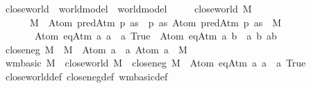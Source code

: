 \begin{isabellebody}
\ close{\isacharunderscore}{\kern0pt}world\ {\isacharcolon}{\kern0pt}{\isacharcolon}{\kern0pt}\ {\isachardoublequoteopen}world{\isacharunderscore}{\kern0pt}model\ {\isasymRightarrow}\ world{\isacharunderscore}{\kern0pt}model{\isachardoublequoteclose}\ \isanewline
\ \ \ \ {\isachardoublequoteopen}close{\isacharunderscore}{\kern0pt}world\ M\ {\isacharequal}{\kern0pt}\isanewline
\ \ \ \ \ \ M\ {\isasymunion}\ {\isacharbraceleft}{\kern0pt}\isactrlbold {\isasymnot}{\isacharparenleft}{\kern0pt}Atom\ {\isacharparenleft}{\kern0pt}predAtm\ p\ as{\isacharparenright}{\kern0pt}{\isacharparenright}{\kern0pt}\ {\isacharbar}{\kern0pt}\ p\ as{\isachardot}{\kern0pt}\ Atom\ {\isacharparenleft}{\kern0pt}predAtm\ p\ as{\isacharparenright}{\kern0pt}\ {\isasymnotin}\ M{\isacharbraceright}{\kern0pt}\isanewline
\ \ \ \ \ \ {\isasymunion}\ {\isacharbraceleft}{\kern0pt}Atom\ {\isacharparenleft}{\kern0pt}eqAtm\ a\ a{\isacharparenright}{\kern0pt}\ {\isacharbar}{\kern0pt}\ a{\isachardot}{\kern0pt}\ True{\isacharbraceright}{\kern0pt}\ {\isasymunion}\ {\isacharbraceleft}{\kern0pt}\isactrlbold {\isasymnot}{\isacharparenleft}{\kern0pt}Atom\ {\isacharparenleft}{\kern0pt}eqAtm\ a\ b{\isacharparenright}{\kern0pt}{\isacharparenright}{\kern0pt}\ {\isacharbar}{\kern0pt}\ a\ b{\isachardot}{\kern0pt}\ a{\isasymnoteq}b{\isacharbraceright}{\kern0pt}{\isachardoublequoteclose}\isanewline
\isanewline
\ \ \isamarkupfalse%
\ {\isachardoublequoteopen}close{\isacharunderscore}{\kern0pt}neg\ M\ {\isasymequiv}\ M\ {\isasymunion}\ {\isacharbraceleft}{\kern0pt}\isactrlbold {\isasymnot}{\isacharparenleft}{\kern0pt}Atom\ a{\isacharparenright}{\kern0pt}\ {\isacharbar}{\kern0pt}\ a{\isachardot}{\kern0pt}\ Atom\ a\ {\isasymnotin}\ M{\isacharbraceright}{\kern0pt}{\isachardoublequoteclose}\isanewline
\ \ \isamarkupfalse%
\ {\isachardoublequoteopen}wm{\isacharunderscore}{\kern0pt}basic\ M\ {\isasymLongrightarrow}\ close{\isacharunderscore}{\kern0pt}world\ M\ {\isacharequal}{\kern0pt}\ close{\isacharunderscore}{\kern0pt}neg\ {\isacharparenleft}{\kern0pt}M\ {\isasymunion}\ {\isacharbraceleft}{\kern0pt}Atom\ {\isacharparenleft}{\kern0pt}eqAtm\ a\ a{\isacharparenright}{\kern0pt}\ {\isacharbar}{\kern0pt}\ a{\isachardot}{\kern0pt}\ True{\isacharbraceright}{\kern0pt}{\isacharparenright}{\kern0pt}{\isachardoublequoteclose}\isanewline
%
\isadelimproof
\ \ \ \ %
\endisadelimproof
%
\isatagproof
{}\isamarkupfalse%
\ close{\isacharunderscore}{\kern0pt}world{\isacharunderscore}{\kern0pt}def\ close{\isacharunderscore}{\kern0pt}neg{\isacharunderscore}{\kern0pt}def\ wm{\isacharunderscore}{\kern0pt}basic{\isacharunderscore}{\kern0pt}def\isanewline

\end{isabellebody}
